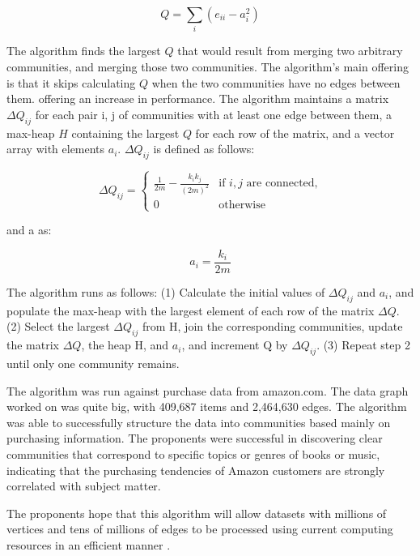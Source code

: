 \begin{equation}
Q = \sum_{i}({e_{ii}-a_i^2})
\end{equation}

The algorithm finds the largest $Q$ that would result from merging two arbitrary communities, and merging those two communities. The algorithm's main offering is that it skips calculating $Q$ when the two communities have no edges between them. offering an increase in performance. The algorithm maintains a matrix $\Delta Q_{ij}$ for each pair i, j of communities with at least one edge between them, a max-heap $H$ containing the largest $Q$ for each row of the matrix, and a vector array with elements $a_{i}$. $\Delta Q_{ij}$ is defined as follows:

\begin{equation}
\Delta Q_{ij} =
\begin {cases}
\frac{1}{2m}-\frac{k_ik_j}{(2m)^2} &\text{if }i, j\text{ are connected,}
\\ 0 & \text{otherwise}
\end{cases}
\end{equation}

and a as:

\begin{equation}
a_i = \frac{k_i}{2m}
\end{equation}

The algorithm runs as follows:
(1) Calculate the initial values of $\Delta Q_{ij}$ and $a_{i}$, and populate the max-heap with the largest element of each row of the matrix $\Delta Q$.
(2) Select the largest $\Delta Q_{ij}$ from H, join the corresponding
communities, update the matrix $\Delta Q$, the heap H, and $a_{i}$, and increment Q by $\Delta Q_{ij}$.
(3) Repeat step 2 until only one community remains.

The algorithm was run against purchase data from amazon.com. The data graph worked on was quite big, with 409,687 items and 2,464,630 edges. The algorithm was able to successfully structure the data into communities based mainly on purchasing information. The proponents were successful in discovering clear communities that correspond to specific topics or genres of books or music, indicating that the purchasing tendencies of Amazon customers are strongly correlated with subject matter.

The proponents hope that this algorithm will allow datasets with millions of vertices and tens of millions of edges to be processed using current computing resources in an efficient manner \cite{Clauset:2004}.

